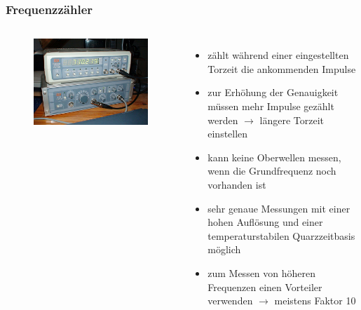 \begin{frame}
  \frametitle{Frequenzzähler}
  \begin{columns}
    \begin{center}
      \begin{figure}
        \includegraphics[width=\textwidth,height=.8\textheight,keepaspectratio]{a16/Frequenzzaehler.jpg}
      \end{figure}
    \end{center}
    \begin{itemize}
      \item zählt während einer eingestellten Torzeit die ankommenden Impulse
      \item zur Erhöhung der Genauigkeit müssen mehr Impulse gezählt werden $\rightarrow$ längere Torzeit einstellen
      \item kann keine Oberwellen messen, wenn die Grundfrequenz noch vorhanden ist
      \item sehr genaue Messungen mit einer hohen Auflösung und einer temperaturstabilen Quarzzeitbasis möglich
      \item zum Messen von höheren Frequenzen einen Vorteiler verwenden $\rightarrow$ meistens Faktor 10
    \end{itemize}
  \end{columns}
\end{frame}

